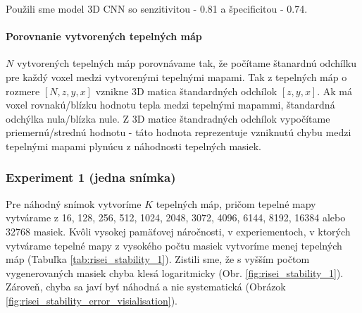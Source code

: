 Použili sme model 3D CNN so senzitivitou - 0.81 a špecificitou - 0.74.

\paragraph{Porovnanie vytvorených tepelných máp}

$N$ vytvorených tepelných máp porovnávame tak, že počítame štanardnú odchílku pre každý voxel medzi vytvorenými tepelnými mapami. Tak z tepelných máp o rozmere $[N, z, y, x]$ vznikne 3D matica štandardných odchílok $[z, y, x]$. Ak má voxel rovnakú/blízku hodnotu tepla medzi tepelnými mapammi, štandardná odchýlka nula/blízka nule. Z 3D matice štandradných odchílok vypočítame priemernú/strednú hodnotu - táto hodnota reprezentuje vzniknutú chybu medzi tepelnými mapami plynúcu z náhodnosti tepelných masiek.

\subsubsection{Experiment 1 (jedna snímka) \label{sec:risei_stability_1}}

Pre náhodný snímok vytvoríme $K$ tepelných máp, pričom tepelné mapy vytvárame z 16, 128, 256, 512, 1024, 2048, 3072, 4096, 6144, 8192, 16384 alebo 32768 masiek. Kvôli vysokej pamäťovej náročnosti, v experiementoch, v ktorých vytvárame tepelné mapy z vysokého počtu masiek vytvoríme menej tepelných máp (Tabuľka \ref{tab:risei_stability_1}). Zistili sme, že s vyšším počtom vygenerovaných masiek chyba klesá logaritmicky (Obr. \ref{fig:risei_stability_1}). Zároveň, chyba sa javí byť náhodná a nie systematická (Obrázok \ref{fig:risei_stability_error_visialisation}).

